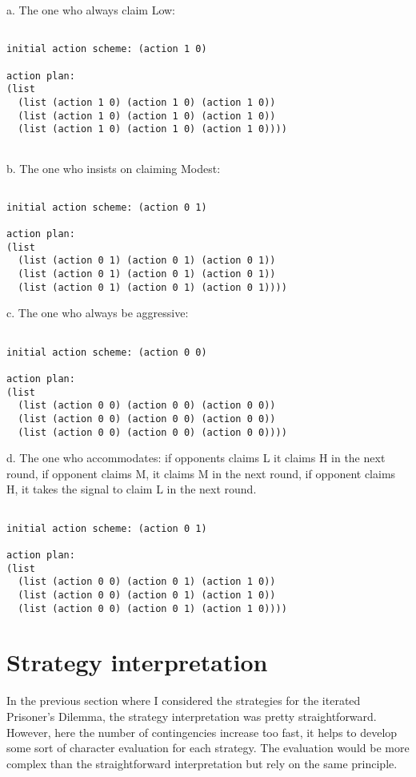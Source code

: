 \documentclass[12.5pt]{report}
\begin{document}
a. The one who always claim Low:

\begin{verbatim}

initial action scheme: (action 1 0)

action plan:
(list
  (list (action 1 0) (action 1 0) (action 1 0))
  (list (action 1 0) (action 1 0) (action 1 0))
  (list (action 1 0) (action 1 0) (action 1 0))))


\end{verbatim}

b. The one who insists on claiming Modest:
\begin{verbatim}

initial action scheme: (action 0 1)

action plan:
(list
  (list (action 0 1) (action 0 1) (action 0 1))
  (list (action 0 1) (action 0 1) (action 0 1))
  (list (action 0 1) (action 0 1) (action 0 1))))

\end{verbatim}

c. The one who always be aggressive:

\begin{verbatim}

initial action scheme: (action 0 0)

action plan:
(list
  (list (action 0 0) (action 0 0) (action 0 0))
  (list (action 0 0) (action 0 0) (action 0 0))
  (list (action 0 0) (action 0 0) (action 0 0))))
\end{verbatim}

d. The one who accommodates: if opponents claims L it claims H in the next round, if opponent claims M, it claims M in the next round, if opponent claims H, it takes the signal to claim L in the next round.

\begin{verbatim}

initial action scheme: (action 0 1)

action plan:
(list
  (list (action 0 0) (action 0 1) (action 1 0))
  (list (action 0 0) (action 0 1) (action 1 0))
  (list (action 0 0) (action 0 1) (action 1 0))))

\end{verbatim}

\section{Strategy interpretation}

In the previous section where I considered the strategies for the iterated Prisoner's Dilemma, the strategy interpretation was pretty straightforward. However, here the number of contingencies increase too fast, it helps to develop some sort of character evaluation for each strategy. The evaluation would be more complex than the straightforward interpretation but rely on the same principle.
\end{document}
